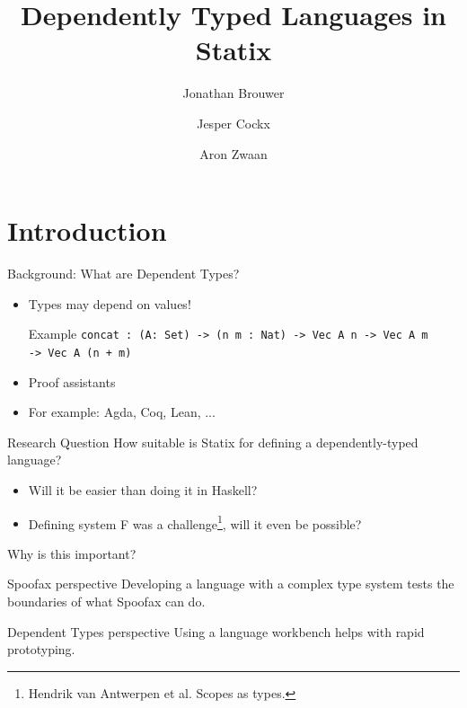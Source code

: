 \documentclass[aspectratio=43]{beamer}
\title[]{Dependently Typed Languages in Statix}
\institute[]{Delft University of Technology, The Netherlands}
\author{Jonathan Brouwer \and Jesper Cockx \and Aron Zwaan}
\begin{document}
\section{Introduction}
{
\frame{\titlepage}
}

\begin{frame}[fragile]{Background: What are Dependent Types?}
\begin{itemize}
	\item Types may depend on values!
	\begin{exampleblock}{Example}
		\texttt{concat : (A: Set) -> (n m : Nat) -> Vec A n -> Vec A m
			\\ \hspace*{48pt} -> Vec A (n + m)}
	\end{exampleblock}
	\item Proof assistants
	\item For example: Agda, Coq, Lean, ...
\end{itemize}


\end{frame}

\begin{frame}[fragile]{Research Question}
\large{How suitable is Statix for defining a dependently-typed language?}
\begin{itemize}
	\item Will it be easier than doing it in Haskell?
	\item Defining system F was a challenge\footnote{Hendrik van Antwerpen et al. Scopes as types.}, will it even be possible?
\end{itemize}

\end{frame}

\begin{frame}[fragile]{Why is this important?}
	\begin{block}{Spoofax perspective}
		Developing a language with a complex type system tests the boundaries of what Spoofax can do.
	\end{block}
	
	\begin{block}{Dependent Types perspective}
		Using a language workbench helps with rapid prototyping.
	\end{block}
\end{frame}
\end{document}
